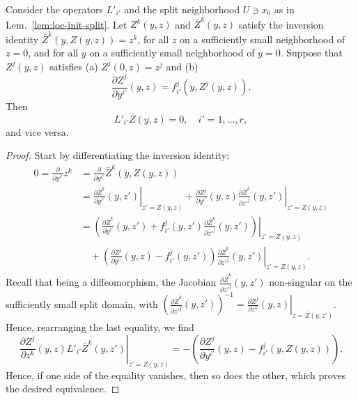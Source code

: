 \begin{lemma} \label{lem:eq-loc-inv}
Consider the operators $L'_{i'}$ and the split neighborhood $U\ni x_0$ as in
Lem.~\ref{lem:loc-init-split}. Let $Z^k(y,z)$ and $\bar{Z}^k(y,z)$ satisfy the
inversion identity $\bar{Z}^k(y, Z(y, z)) = z^k$, for all $z$ on a sufficiently
small neighborhood of $z=0$, and for all $y$ on a sufficiently small
neighborhood of $y=0$. Suppose that $Z^j(y,z)$ satisfies (a) $Z^j(0,z) = z^j$
and (b)
\[
  \frac{\partial Z^j}{\partial y^{i'}}(y,z) = f_{i'}^j(y, Z^j(y,z)) .
\]
Then
\[
  L'_{i'} \bar{Z}(y,z) = 0, \quad i'=1,\ldots,r ,
\]
and vice versa.
\end{lemma}
\begin{proof}
Start by differentiating the inversion identity:
\begin{align*}
  0 = \frac{\partial}{\partial y^{i'}} z^k
  &= \frac{\partial}{\partial y^{i'}} \bar{Z}^k(y, Z(y, z))
  \\
  &= \left. \frac{\partial \bar{Z}^k}{\partial y^{i'}}(y, z') \right|_{z'=Z(y,z)}
    + \frac{\partial Z^j}{\partial y^{i'}}(y,z)
      \left. \frac{\partial \bar{Z}^k}{\partial z'^j}(y,z') \right|_{z'=Z(y,z)}
  \\
  &= \left. \left(\frac{\partial \bar{Z}^k}{\partial y^{i'}}(y, z')
      + f_{i'}^j(y,z') \frac{\partial \bar{Z}^k}{\partial z'^j}(y,z')\right) \right|_{z'=Z(y,z)}
    \\ &\quad {}
    + \left. \left(\frac{\partial Z^j}{\partial y^{i'}}(y,z) - f_{i'}^j(y,z')\right)
      \frac{\partial \bar{Z}^k}{\partial z'^j}(y,z') \right|_{z'=Z(y,z)}
    .
\end{align*}
Recall that being a diffeomorphism, the Jacobian $\frac{\partial
\bar{Z}^k}{\partial z'^j}(y,z')$ non-singular on the sufficiently small split
domain, with $(\frac{\partial
\bar{Z}^k}{\partial z'^j}(y,z'))^{-1} = \left. \frac{\partial Z^j}{\partial z^k}(y,z) \right|_{z=\bar{Z}(y,z')}$. Hence, rearranging the last equality, we find
\[
  \left. \frac{\partial Z^j}{\partial z^k}(y,z)
    L'_{i'} \bar{Z}^k(y,z') \right|_{z'=Z(y,z)}
  = -\left(\frac{\partial Z^j}{\partial y^{i'}}(y,z) - f_{i'}^j(y,Z(y,z))\right) .
\]
Hence, if one side of the equality vanishes, then so does the other, which
proves the desired equivalence.
\end{proof}

